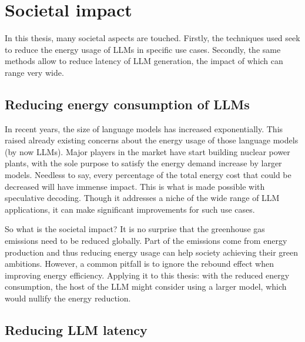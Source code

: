 
\chapter{Societal impact}
\label{sec:societal_impact}

In this thesis, many societal aspects are touched. Firstly, the techniques used seek to reduce the energy usage of LLMs in specific use cases. Secondly, the same methods allow to reduce latency of LLM generation, the impact of which can range very wide.

\section{Reducing energy consumption of LLMs}

In recent years, the size of language models has increased exponentially. This raised already existing concerns about the energy usage of those language models (by now LLMs). Major players in the market have start building nuclear power plants, with the sole purpose to satisfy the energy demand increase by larger models. Needless to say, every percentage of the total energy cost that could be decreased will have immense impact. This is what is made possible with speculative decoding. Though it addresses a niche of the wide range of LLM applications, it can make significant improvements for such use cases. 

So what is the societal impact? It is no surprise that the greenhouse gas emissions need to be reduced globally. Part of the emissions come from energy production and thus reducing energy usage can help society achieving their green ambitions. However, a common pitfall is to ignore the rebound effect when improving energy efficiency. Applying it to this thesis: with the reduced energy consumption, the host of the LLM might consider using a larger model, which would nullify the energy reduction. 

\section{Reducing LLM latency}


